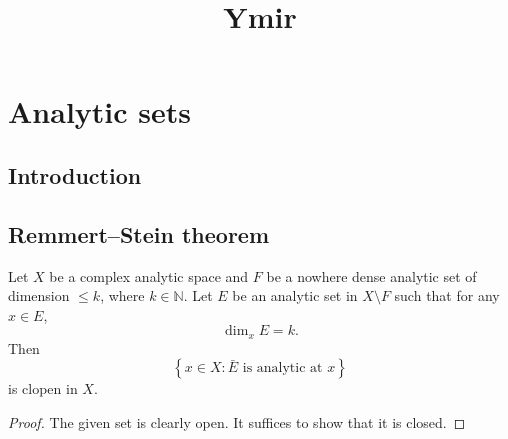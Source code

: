 
\title{Ymir}

\maketitle
\tableofcontents

\chapter*{Analytic sets}\label{chap-AS}

\section{Introduction}\label{sec-introduction-AS}

\section{Remmert--Stein theorem}

\begin{lemma}
    Let $X$ be a complex analytic space and $F$ be a nowhere dense analytic set of dimension $\leq k$, where $k\in \mathbb{N}$. Let $E$ be an analytic set in $X\setminus F$ such that for any $x\in E$,
    \[
        \dim_x E=k.  
    \]
    Then
    \[
        \left\{x\in X: \bar{E}\text{ is analytic at }x \right\}  
    \]
    is clopen in $X$.
\end{lemma}
\begin{proof}
    The given set is clearly open. It suffices to show that it is closed.

    
\end{proof}


\cite{stacks-project}

\printbibliography
